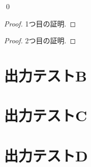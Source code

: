 \documentclass[uplatex, dvipdfmx, a4paper, 12pt, class=jsbook, crop=false]{standalone}
\begin{document}
\begin{definition}[テスト定義B]
	\label{def:test-def-B}
	\lipsum[1][2]
\end{definition}

\begin{theorem}[テスト定理A]
	\label{thm:test-thm-A}
	\WIP
	\lipsum[1][2]
\end{theorem}

\begin{corollary}
	\label{cor:test-corollary-A}
	\lipsum[1][2]
	\qed
\end{corollary}

\begin{corollary}
	\label{cor:test-corollary-B}
	\lipsum[1][2]
\end{corollary}

\begin{proposition}
	\label{prop:test-prop-A}
	\lipsum[1][2]
\end{proposition}

\begin{proof}
	\label{pf:test-proof-A}
	1つ目の証明.
\end{proof}

\begin{proof}
	\label{pf:test-proof-B}
	2つ目の証明.
\end{proof}

\begin{problem}
	\label{prob:test-problem-A}
	\WIP
	\lipsum[1][2]
\end{problem}

\section{出力テストB}
\label{sec:test-B}
\lipsum[2-3]

\section{出力テストC}
\label{sec:test-C}
\WIP
\lipsum[4][1]

\section{出力テストD}
\label{sec:test-D}
\lipsum[4][1-3]
\end{document}
